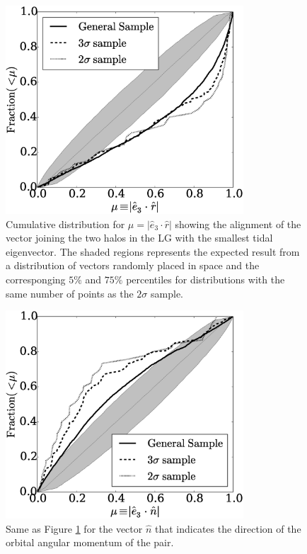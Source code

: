 \documentclass{iau}
\begin{document}
\begin{figure}[t]
\begin{center}
 \includegraphics[width=3.5in]{alignments_e3_r_all_environments.eps} 
 \caption{Cumulative distribution for $\mu=|\hat{e}_{3}\cdot\hat{r}|$
   showing the alignment of the vector joining the two halos in the LG
 with the smallest tidal eigenvector. The shaded regions represents
 the expected result from a distribution of vectors randomly placed in
 space and the corresponging $5\%$ and $75\%$ percentiles for
 distributions with the same number of points as the $2\sigma$ sample.}
   \label{fig:alignment_r}
\end{center}
\end{figure}

\begin{figure}[b]
\begin{center}
 \includegraphics[width=3.5in]{alignments_e3_n_all_environments.eps} 
 \caption{Same as Figure \ref{fig:alignment_r} for the vector $\hat
   n$ that indicates the direction of the orbital angular momentum of
   the pair.}
   \label{fig:alignment_n}
\end{center}
\end{figure}
\end{document}

